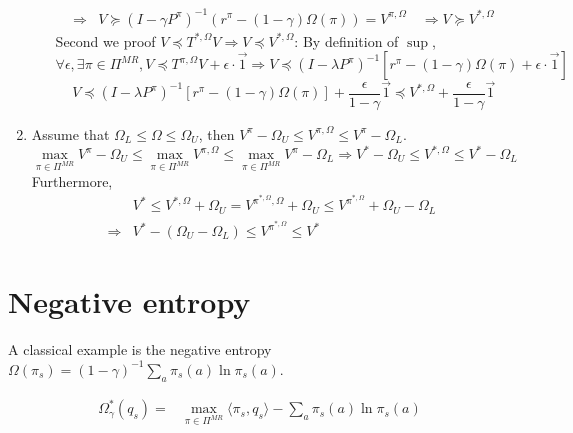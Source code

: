 \documentclass[a4paper]{article}
\begin{document}
\begin{enumerate}
\begin{itemize}
\begin{align*}
                    \Rightarrow& V \succeq {(I - \gamma P^{\pi})}^{-1}(r^{\pi} - (1-\gamma)\Omega(\pi)) = V^{\pi,\Omega}
                    \quad \Rightarrow V \succeq V^{*, \Omega}
                \end{align*}
                Second we proof $ V \preceq T^{*,\Omega} V \Rightarrow V \preceq V^{*,\Omega}$:
                By definition of $ \sup $,
                \[
                    \forall \epsilon, \exists \pi \in \Pi^{MR}, V \preceq T^{\pi, \Omega}V + \epsilon \cdot \vec{1}
                    \Rightarrow V \preceq {(I - \lambda P^{\pi})}^{-1} [r^{\pi} - (1-\gamma)\Omega(\pi) + \epsilon \cdot \vec{1}] 
                \]
                \[
                    V \preceq {(I - \lambda P^{\pi})}^{-1} [r^{\pi} - (1-\gamma)\Omega(\pi)] + \frac{\epsilon}{1 - \gamma} \vec{1} \preceq V^{*, \Omega} + \frac{\epsilon}{1 - \gamma} \vec{1}
                \]
        \end{itemize}
    \item Assume that $ \Omega_L \le \Omega \le \Omega_U $, then $ V^{\pi} - \Omega_U \le V^{\pi, \Omega} \le V^{\pi} - \Omega_L $.
        \[
             \max_{\pi \in \Pi^{MR}} V^{\pi} - \Omega_U \le \max_{\pi \in \Pi^{MR}} V^{\pi, \Omega} \le \max_{\pi \in \Pi^{MR}} V^{\pi} - \Omega_L \Rightarrow V^{*} - \Omega_U \le V^{*, \Omega} \le V^{*} - \Omega_L
        \]
        Furthermore,
        \begin{align*}
            &V^{*} \le V^{*, \Omega} + \Omega_U = V^{\pi^{*, \Omega}, \Omega} + \Omega_U \le V^{\pi^{*,\Omega}} + \Omega_U - \Omega_L \\
            \Rightarrow& V^* - \left( \Omega_U - \Omega_L \right) \le V^{\pi^{*, \Omega}} \le V^{*}
        \end{align*}
\end{enumerate}

\section{Negative entropy}%

A classical example is the negative entropy $ \Omega(\pi_s) = {(1 - \gamma)}^{-1}\sum^{}_{a} \pi_s(a) \ln \pi_s(a) $.

\begin{align*}
    \Omega^{*}_{\gamma}(q_s) =& \max_{\pi \in \Pi^{MR}} \langle \pi_s, q_s \rangle - \sum^{}_{a} \pi_s(a) \ln \pi_s(a)\\
\end{align*}
\end{document}

